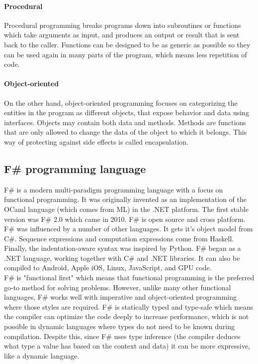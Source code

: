 \documentclass[12pt, a4paper]{article}
\begin{document}
\newpage
\paragraph{Procedural} Procedural programming breaks programs down into subroutines or functions which take arguments as input, and produces an output or result that is sent back to the caller. Functions can be designed to be as generic as possible so they can be used again in many parts of the program, which means less repetition of code.

\paragraph{Object-oriented} On the other hand, object-oriented programming focuses on categorizing the entities in the program as different objects, that expose behavior and data using interfaces. Objects may contain both data and methods. Methods are functions that are only allowed to change the data of the object to which it belongs. This way of protecting against side effects is called encapsulation.


\newpage
\subsection{F\# programming language}
F\# is a modern multi-paradigm programming language with a focus on functional programming. It was originally invented as an implementation of the OCaml language (which comes from ML) in the .NET platform. The first stable version was F\# 2.0 which came in 2010. F\# is open source and cross platform. F\# was influenced by a number of other languages. It gets it’s object model from C\#. Sequence expressions and computation expressions come from Haskell. Finally, the indentation-aware syntax was inspired by Python. F\# began as a .NET language, working together with C\# and .NET libraries. It can also be compiled to Android, Apple iOS, Linux, JavaScript, and GPU code.\\

F\# is "functional first" which means that functional programming is the preferred go-to method for solving problems. However, unlike many other functional languages, F\# works well with imperative and object-oriented programming where those styles are required. F\# is statically typed and type-safe which means the compiler can optimize the code deeply to increase performance, which is not possible in dynamic languages where types do not need to be known during compilation. Despite this, since F\# uses type inference (the compiler deduces what type a value has based on the context and data) it can be more expressive, like a dynamic language.\\
\end{document}

